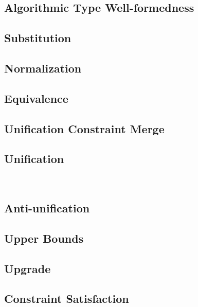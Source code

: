 \documentclass[acmsmall,natbib=false,review,anonymous]{acmart}
\newcommand{\genDir}{_gen}
\begin{document}
\subsection{Algorithmic Type Well-formedness}


\subsection{Substitution}


\subsection{Normalization}


\subsection{Equivalence}


\subsection{Unification Constraint Merge}


\subsection{Unification}
\

\subsection{Anti-unification}


\subsection{Upper Bounds}
\label{sec:alg-upper-bounds-proofs}


\subsection{Upgrade}
\label{sec:upgrade-lemmas}


\subsection{Constraint Satisfaction}

\end{document}
